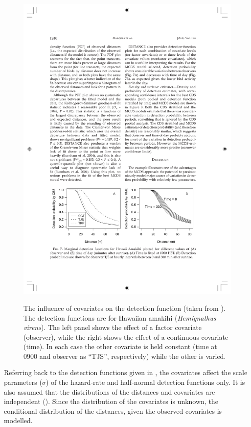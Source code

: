 \begin{figure}
\centering
\includegraphics{intro/figs/amakihi-detfct.pdf}\\
\caption{The influence of covariates on the detection function (taken from \cite{amakihi}). The detection functions are for Hawaiian amakihi (\textit{Hemignathus virens}). The left panel shows the effect of a factor covariate (observer), while the right shows the effect of a continuous covariate (time). In each case the other covariate is held constant (time at $0900$ and observer as ``TJS'', respectively) while the other is varied.}
\label{ds-covarex}
\end{figure}

\label{cor-7s10}\label{cor-8s3-2}Referring back to the detection functions given in , the covariates affect the scale parameters ($\sigma$) of the hazard-rate and half-normal detection functions only. It is also assumed that the distributions of the distances and covariates are independent (\cite{covpaper}). Since the distribution of the covariates is unknown, the conditional distribution of the distances, given the observed covariates is modelled.

